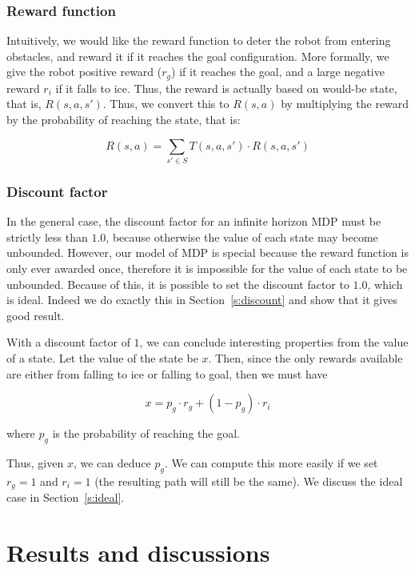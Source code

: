 \documentclass[a4paper]{article}
\begin{document}
\subsubsection{Reward function}
\label{sec:r}
Intuitively, we would like the reward function to deter the robot from entering
obstacles, and reward it if it reaches the goal configuration. More formally,
we give the robot positive reward ($r_g$) if it reaches the goal, and a large negative
reward $r_i$ if it falls to ice. Thus, the reward is actually based on would-be state,
that is, $R(s, a, s')$. Thus, we convert this to $R(s, a)$ by multiplying the
reward by the probability of reaching the state, that is:

\[ R(s, a) = \sum_{s' \in S} T(s, a, s') \cdot R(s, a, s') \]

\subsubsection{Discount factor}

In the general case, the discount factor for an infinite horizon MDP must be
strictly less than $1.0$, because otherwise the value of each state may become
unbounded. However, our model of MDP is special because the reward function is
only ever awarded once, therefore it is impossible for the value of each state
to be unbounded. Because of this, it is possible to set the discount factor to
$1.0$, which is ideal. Indeed we do exactly this in Section~\ref{s:discount}
and show that it gives good result.

With a discount factor of $1$, we can conclude interesting properties from the
value of a state. Let the value of the state be $x$. Then, since the only
rewards available are either from falling to ice or falling to goal, then we
must have

$$x = p_g \cdot r_g + (1 - p_g) \cdot r_i$$

where $p_g$ is the probability of reaching the goal.

Thus, given $x$, we can deduce $p_g$. We can compute this more easily if we
set $r_g = 1$ and $r_i = 1$ (the resulting path will still be the same).
We discuss the ideal case in Section~\ref{s:ideal}.

\section{Results and discussions}
\end{document}

